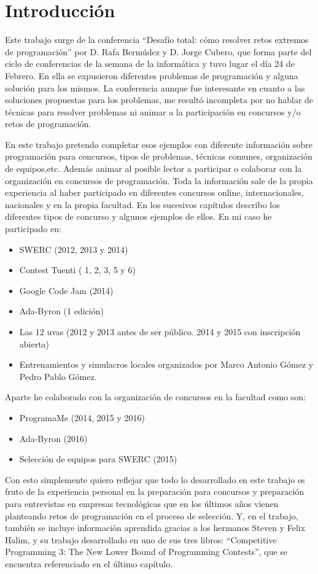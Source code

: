 \chapter{Introducción}
\label{ch:introduccion}

Este trabajo surge de la conferencia “Desafío total: cómo resolver
retos extremos de programación” por D. Rafa Bermúdez y D. Jorge
Cubero, que forma parte del ciclo de conferencias de la semana de la
informática y tuvo lugar el día 24 de Febrero. En ella se expusieron
diferentes problemas de programación y alguna solución para los
mismos. La conferencia aunque fue interesante en cuanto a las
soluciones propuestas para los problemas, me resultó incompleta por no
hablar de técnicas para resolver problemas ni animar a la
participación en concursos y/o retos de programación.

En este trabajo pretendo completar esos ejemplos con diferente
información sobre programación para concursos, tipos de problemas,
técnicas comunes, organización de equipos,etc. Además animar al
posible lector a participar o colaborar con la organización en
concursos de programación. Toda la información sale de la propia
experiencia al haber participado en diferentes concursos online,
internacionales, nacionales y en la propia facultad. En los sucesivos
capítulos describo los diferentes tipos de concurso y algunos ejemplos
de ellos. En mi caso he participado en:

\begin{itemize}
\item SWERC (2012, 2013 y 2014)
\item Contest Tuenti ( 1, 2, 3, 5 y 6)
\item Google Code Jam (2014)
\item Ada-Byron (1 edición)
\item Las 12 uvas (2012 y 2013 antes de ser público. 2014 y 2015 con
  inscripción abierta)
\item Entrenamientos y simulacros locales organizados por Marco
  Antonio Gómez y Pedro Pablo Gómez.
\end{itemize}

Aparte he colaborado con la organización de concursos en la facultad
como son:

\begin{itemize}
\item ProgramaMe (2014, 2015 y 2016)
\item Ada-Byron (2016)
\item Selección de equipos para SWERC (2015)
\end{itemize}

Con esto simplemente quiero reflejar que todo lo desarrollado en este
trabajo es fruto de la experiencia personal en la preparación para
concursos y preparación para entrevistas en empresas tecnológicas que
en los últimos años vienen planteando retos de programación en el
proceso de selección. Y, en el trabajo, también se incluye información
aprendida gracias a los hermanos Steven y Felix Halim, y su trabajo
desarrollado en uno de sus tres libros: “Competitive Programming 3:
The New Lower Bound of Programming Contests”, que se encuentra
referenciado en el último capítulo.

